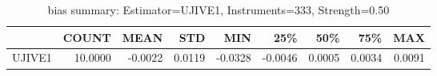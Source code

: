\begin{table}[ht]
\centering
\caption{bias summary: Estimator=UJIVE1, Instruments=333, Strength=0.50}
\begin{tabular}{lrrrrrrrr}
\toprule
 & COUNT & MEAN & STD & MIN & 25\% & 50\% & 75\% & MAX \\
\midrule
UJIVE1 & 10.0000 & -0.0022 & 0.0119 & -0.0328 & -0.0046 & 0.0005 & 0.0034 & 0.0091 \\
\bottomrule
\end{tabular}
\end{table}
